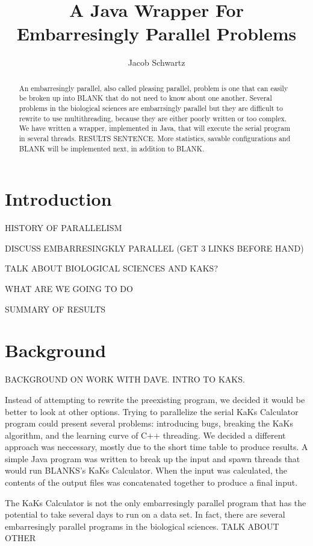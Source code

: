 \documentclass[12pt]{article}
\begin{document}
\title{A Java Wrapper For Embarresingly Parallel Problems}
\author{Jacob Schwartz}
\maketitle

\begin{abstract}
An embarresingly parallel, also called pleasing parallel, problem is one that 
can easily be broken up into BLANK that do not need to know about one another.
Several problems in the biological sciences are embarrsingly parallel but they
are difficult to rewrite to use multithreading, because they are either poorly
written or too complex. We have written a wrapper, implemented in Java, that
will execute the serial program in several threads. RESULTS SENTENCE. More
statistics, savable configurations and BLANK will be implemented next, in
addition to BLANK.
\end{abstract}


\section{Introduction}

HISTORY OF PARALLELISM

DISCUSS EMBARRESINGKLY PARALLEL (GET 3 LINKS BEFORE HAND)

TALK ABOUT BIOLOGICAL SCIENCES AND KAKS?

WHAT ARE WE GOING TO DO

SUMMARY OF RESULTS

\section{Background}

BACKGROUND ON WORK WITH DAVE. INTRO TO KAKS.

Instead of attempting to rewrite the preexisting program, we decided it would be
better to look at other options. Trying to parallelize the serial KaKs 
Calculator program could present several problems: introducing bugs, breaking 
the KaKs algorithm, and the learning curve of C++ threading. We decided a 
different approach was neccessary, mostly due to the short time table to produce
results. A simple Java program was written to break up the input and spawn 
threads that would run BLANKS's KaKs Calculator\cite{blah}. When the input was 
calculated, the contents of the output files was concatenated together 
to produce a final input. 

The KaKs Calculator is not the only embarresingly parallel program that has the
potential to take several days to run on a data set. In fact, there are several
embarresingly parallel programs in the biological sciences. TALK ABOUT OTHER
\end{document}

